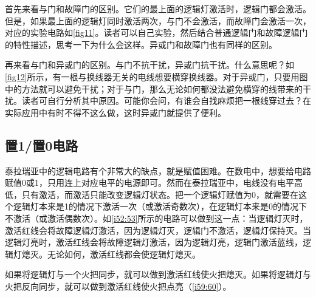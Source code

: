 首先来看与门和故障门的区别。它们的最上面的逻辑灯激活时，逻辑门都会激活。但是，如果最上面的逻辑灯同时激活两次，与门不会激活，而故障门会激活一次，对应的实验电路如\autoref{fig11}。读者可以自己实验，然后结合普通逻辑门和故障逻辑门的特性描述，思考一下为什么会这样。异或门和故障门也有同样的区别。

再来看与门和异或门的区别。与门不抗干扰，异或门抗干扰。什么意思呢？如\autoref{fig12}所示，有一根与换线器无关的电线想要横穿换线器。对于异或门，只要用图中的方法就可以避免干扰；对于与门，那么无论如何都没法避免横穿的线带来的干扰。读者可自行分析其中原因。可能你会问，有谁会自找麻烦把一根线穿过去？在实际应用中有时不得不这么做，这时异或门就提供了便利。

\subsection{置1/置0电路}\label{sec14}

泰拉瑞亚中的逻辑电路有个非常大的缺点，就是赋值困难。在数电中，想要给电路赋值0或1，只用连上对应电平的电源即可。然而在泰拉瑞亚中，电线没有电平高低，只有激活，而激活只能改变逻辑灯状态。把一个逻辑灯赋值为0，就需要在这个逻辑灯本来是1的情况下激活一次（或激活奇数次），在逻辑灯本来是0的情况下不激活（或激活偶数次）。如\autoref{i52:53}所示的电路可以做到这一点：当逻辑灯灭时，激活红线会将故障逻辑灯激活，因为逻辑灯灭，逻辑门不激活，逻辑灯保持灭。当逻辑灯亮时，激活红线会将故障逻辑灯激活，因为逻辑灯亮，逻辑门激活蓝线，逻辑灯熄灭。无论如何，激活红线都会使逻辑灯熄灭。

\begin{figure}[!ht]
\begin{center}
\end{center}
\caption{}
\label{i52:53}
\end{figure}

如果将逻辑灯与一个火把同步，就可以做到激活红线使火把熄灭。如果将逻辑灯与火把反向同步，就可以做到激活红线使火把点亮（\autoref{i59:60}）。

